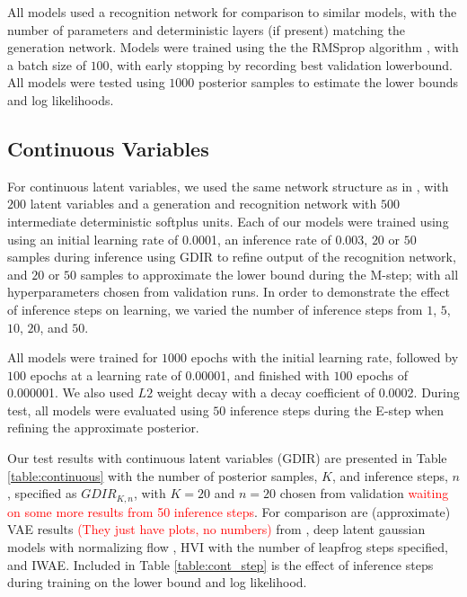 \documentclass{article} %
\newcommand{\alert}[1]{\textcolor{red}{#1}}
\begin{document}
All models used a recognition network for comparison to similar models, with
the number of parameters and deterministic layers (if present) matching the
generation network. Models were trained using the the RMSprop algorithm
\citep{Hinton-Coursera2012}, with a batch size of $100$, with early stopping by
recording best validation lowerbound. All models were tested using $1000$ posterior samples
to estimate the lower bounds and log likelihoods.

\subsection{Continuous Variables}
For continuous latent variables, we used the same network structure as in
\citep{kingma2013auto, salimans2014markov}, with $200$ latent variables and a
generation and recognition network with $500$ intermediate deterministic
softplus units. Each of our models were trained using using an initial learning
rate of \num{0.0001}, an inference rate of \num{0.003}, $20$ or $50$ samples
during inference using GDIR to refine output of the recognition network, and
$20$ or $50$ samples to approximate the lower bound during the M-step; with all
hyperparameters chosen from validation runs. In order to demonstrate the effect
of inference steps on learning, we varied the number of inference steps from
$1$, $5$, $10$, $20$, and $50$.

All models were trained for $1000$ epochs with the initial learning rate,
followed by $100$ epochs at a learning rate of \num{0.00001}, and finished with
$100$ epochs of \num{0.000001}. We also used $L2$ weight decay with a decay
coefficient of \num{0.0002}. During test, all models were evaluated using $50$
inference steps during the E-step when refining the approximate posterior.

Our test results with continuous latent variables (GDIR) are presented in Table
\ref{table:continuous} with the number of posterior samples, $K$, and inference
steps, $n$, specified as $GDIR_{K, n}$, with $K=20$ and $n=20$ chosen from
validation \alert{waiting on some more results from 50 inference steps}. For comparison are
(approximate) VAE results \alert{(They just have plots, no numbers)} from
\citep{kingma2013auto}, deep latent gaussian models with normalizing flow
\citep[DLGM+NF,][]{rezende2015variational}, HVI with the number of leapfrog steps
specified, and IWAE. Included in Table \ref{table:cont_step} is
the effect of inference steps during training on the lower bound and log
likelihood.
\end{document}
